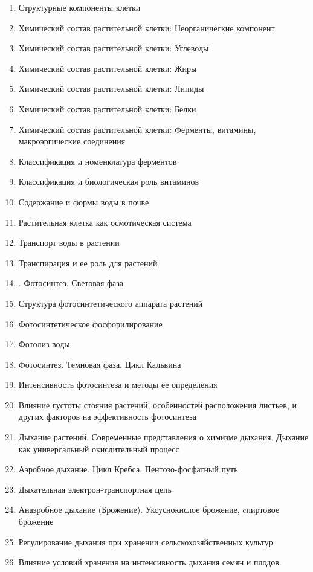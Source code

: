 \begin{enumerate}
	\item Структурные компоненты клетки
	\item Химический состав растительной клетки: Неорганические компонент
	\item Химический состав растительной клетки: Углеводы
	\item Химический состав растительной клетки: Жиры
	\item Химический состав растительной клетки: Липиды
	\item Химический состав растительной клетки: Белки
	\item Химический состав растительной клетки: Ферменты, витамины, макроэргические соединения 
	\item Классификация и номенклатура ферментов
	\item Классификация и биологическая роль витаминов
	\item Содержание и формы воды в почве
	\item Растительная клетка как осмотическая система
	\item Транспорт воды в растении
	\item Транспирация и ее роль для растений
	\item. Фотосинтез. Световая фаза
	\item Структура фотосинтетического аппарата растений
	\item Фотосинтетическое фосфорилирование
	\item Фотолиз воды
	\item Фотосинтез. Темновая фаза. Цикл  Кальвина
	\item Интенсивность фотосинтеза и методы ее определения
	\item Влияние густоты стояния растений, особенностей расположения листьев, и других факторов на эффективность фотосинтеза
	\item Дыхание растений. Современные представления о химизме дыхания. Дыхание как универсальный окислительный процесс
	\item Аэробное дыхание. Цикл Кребса. Пентозо-фосфатный путь
	\item Дыхательная электрон-транспортная цепь
	\item Анаэробное дыхание (Брожение). Уксуснокислое брожение, cпиртовое брожение
	\item Регулирование дыхания при хранении сельскохозяйственных культур
	\item Влияние условий хранения на интенсивность дыхания семян и плодов.

\end{enumerate}
